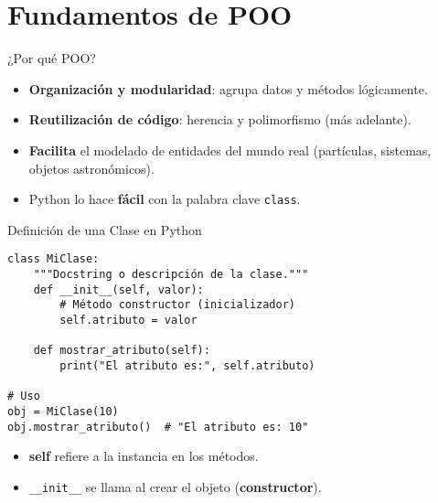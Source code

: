 \documentclass[10pt]{beamer}
\begin{document}
\section{Fundamentos de POO}

\begin{frame}{¿Por qué POO?}
  \begin{itemize}
    \item \textbf{Organización y modularidad}: agrupa datos y métodos lógicamente.
    \item \textbf{Reutilización de código}: herencia y polimorfismo (más adelante).
    \item \textbf{Facilita} el modelado de entidades del mundo real (partículas, sistemas, objetos astronómicos).
    \item Python lo hace \textbf{fácil} con la palabra clave \texttt{class}.
  \end{itemize}
\end{frame}

\begin{frame}[fragile]{Definición de una Clase en Python}
\begin{verbatim}
class MiClase:
    """Docstring o descripción de la clase."""
    def __init__(self, valor):
        # Método constructor (inicializador)
        self.atributo = valor
    
    def mostrar_atributo(self):
        print("El atributo es:", self.atributo)

# Uso
obj = MiClase(10)
obj.mostrar_atributo()  # "El atributo es: 10"
\end{verbatim}
\begin{itemize}
  \item \textbf{self} refiere a la instancia en los métodos.
  \item \texttt{\_\_init\_\_} se llama al crear el objeto (\textbf{constructor}).
\end{itemize}
\end{frame}
\end{document}
